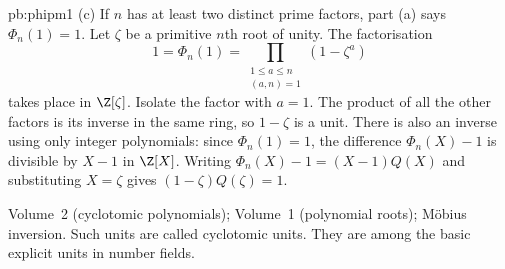 \begin{solution}{pb:phipm1}
(c) If $n$ has at least two distinct prime factors, part (a) says $\Phi_n(1)=1$. Let $\zeta$ be a primitive $n$th root of unity. The factorisation
\[
1=\Phi_n(1)=\prod_{\substack{1\le a\le n\\(a,n)=1}}(1-\zeta^a)
\]
takes place in $\Z[\zeta]$. Isolate the factor with $a=1$. The product of all the other factors is its inverse in the same ring, so $1-\zeta$ is a unit. There is also an inverse using only integer polynomials: since $\Phi_n(1)=1$, the difference $\Phi_n(X)-1$ is divisible by $X-1$ in $\Z[X]$. Writing $\Phi_n(X)-1=(X-1)Q(X)$ and substituting $X=\zeta$ gives $(1-\zeta)Q(\zeta)=1$.

\tools Volume~2 (cyclotomic polynomials); Volume~1 (polynomial roots); Möbius inversion.
\leads Such units are called cyclotomic units. They are among the basic explicit units in number fields.
\end{solution}

